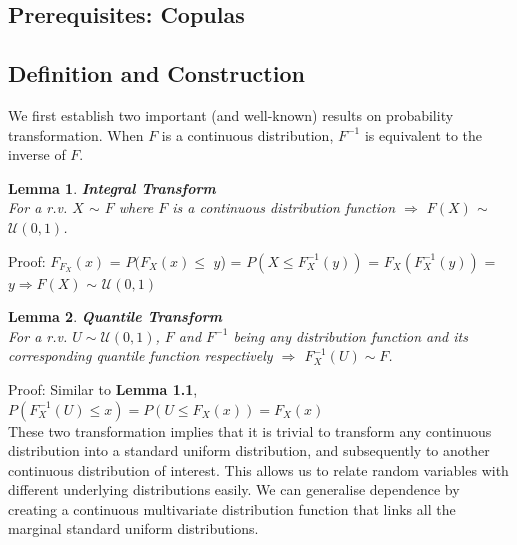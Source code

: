 \documentclass[12pt]{report}
\newtheorem{lemma}{Lemma}[subsection]
\newcommand{\1}{\mathbf{1}}
\begin{document}
\begin{flushleft}
\newpage

\section{Prerequisites: Copulas}
\vspace{0.5cm}
\subsection{Definition and Construction}
\vspace{0.5cm}

We first establish two important (and well-known) results on probability transformation. When $F$ is a continuous distribution, $F^{-1}$ is equivalent to the inverse of $F$.\\


\begin{lemma}\label{IntegralTransform} 
\textbf{Integral Transform} \\

For a r.v. $X$ $\sim$ $F$ where $F$ is a continuous distribution function $\Rightarrow$ $F(X)$ $\sim$ $\mathcal{U}(0,1)$.
\end{lemma}
Proof:  \parencite{HofertBook} $F_{F_{X}}(x)$ = $P(F_{X}(x) $$\le$ $y$) = $P(X \le F^{-1}_{X}(y))$ = $F_{X}(F^{-1}_{X}(y))$ = $y \Rightarrow F(X)$ $\sim$ $\mathcal{U}(0,1)$ 
\\


\begin{lemma}\label{QuantileTransform}
\textbf{Quantile Transform} \\

For a r.v. $U \sim \mathcal{U}(0,1)$, $F$ and $F^{-1}$ being any distribution function and its corresponding quantile function respectively $\Rightarrow$ $F^{-1}_{X}(U) \sim F $.
\end{lemma}
Proof: Similar to \textbf{Lemma 1.1}, $P(F^{-1}_{X}(U) \le x) = P(U \le F_{X}(x)) = F_{X}(x)$
\\

\vspace{0.5cm}
These two transformation implies that it is trivial to transform any continuous distribution into a standard uniform distribution, and subsequently to another continuous distribution of interest. This allows us to relate random variables with different underlying distributions easily. We can generalise dependence by creating a continuous multivariate distribution function that links all the marginal standard uniform distributions. 


\end{flushleft}
\end{document}
